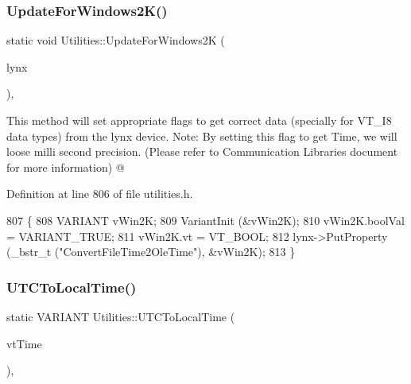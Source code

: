 \mbox{\label{class_utilities_aa6708b10aa75dcf1e10490914a0eb1b1_aa6708b10aa75dcf1e10490914a0eb1b1}} 
\subsubsection{\texorpdfstring{Update\+For\+Windows2\+K()}{UpdateForWindows2K()}}
{\footnotesize\ttfamily static void Utilities\+::\+Update\+For\+Windows2K (\begin{DoxyParamCaption}\item[{Dev\+Cntl\+::\+I\+Device\+Ptr}]{lynx }\end{DoxyParamCaption})\hspace{0.3cm}{\ttfamily [inline]}, {\ttfamily [static]}}

This method will set appropriate flags to get correct data (specially for V\+T\+\_\+\+I8 data types) from the lynx device. Note\+: By setting this flag to get Time, we will loose milli second precision. (Please refer to Communication Libraries document for more information) @ 

Definition at line 806 of file utilities.\+h.


\begin{DoxyCode}
807     \{
808         VARIANT vWin2K;
809         VariantInit (&vWin2K);
810         vWin2K.boolVal = VARIANT\_TRUE;
811         vWin2K.vt = VT\_BOOL;
812         lynx->PutProperty (\_bstr\_t (\textcolor{stringliteral}{"ConvertFileTime2OleTime"}), &vWin2K);
813     \}
\end{DoxyCode}
\mbox{\label{class_utilities_a0eec445d3ab7471d967af4d5d9daceaa_a0eec445d3ab7471d967af4d5d9daceaa}} 
\subsubsection{\texorpdfstring{U\+T\+C\+To\+Local\+Time()}{UTCToLocalTime()}}
{\footnotesize\ttfamily static V\+A\+R\+I\+A\+NT Utilities\+::\+U\+T\+C\+To\+Local\+Time (\begin{DoxyParamCaption}\item[{V\+A\+R\+I\+A\+NT \&}]{vt\+Time }\end{DoxyParamCaption})\hspace{0.3cm}{\ttfamily [inline]}, {\ttfamily [static]}}

